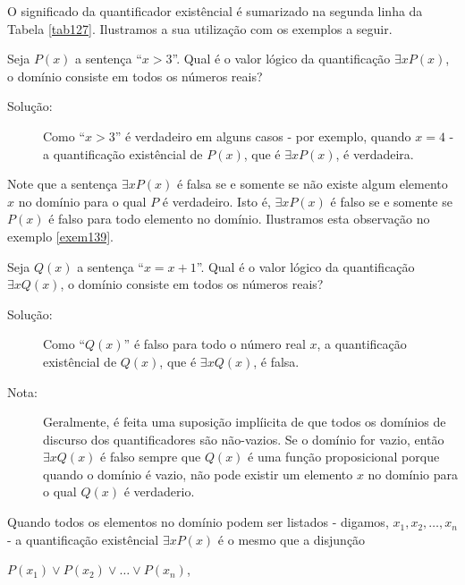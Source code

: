 O significado da quantificador existêncial é sumarizado na segunda linha da
Tabela \ref{tab127}. Ilustramos a sua utilização com os exemplos a seguir.

\begin{exmp}
\label{exem138}
Seja $P(x)$ a sentença ``$x>3$''. Qual é o valor lógico da quantificação
$\exists xP(x)$, o domínio consiste em todos os números reais?
\begin{description}
\item[Solução:] Como ``$x>3$'' é verdadeiro em alguns casos - por exemplo,
quando $x=4$ - a quantificação existêncial de $P(x)$, que é $\exists xP(x)$, é
verdadeira.
\end{description}
\end{exmp}

Note que a sentença $\exists xP(x)$ é falsa se e somente se não existe algum
elemento $x$ no domínio para o qual $P$ é verdadeiro. Isto é, $\exists xP(x)$ é
falso se e somente se $P(x)$ é falso para todo elemento no domínio. Ilustramos
esta observação no exemplo \ref{exem139}.

\begin{exmp}
\label{exem139}
Seja $Q(x)$ a sentença ``$x=x+1$''. Qual é o valor lógico da quantificação
$\exists xQ(x)$, o domínio consiste em todos os números reais?
\begin{description}
\item[Solução:] Como ``$Q(x)$'' é falso para todo o número real $x$, a
quantificação existêncial de $Q(x)$, que é $\exists xQ(x)$, é falsa.
\end{description}
\end{exmp}

\begin{description}
\item[Nota:] Geralmente, é feita uma suposição implíicita de que todos os
domínios de discurso dos quantificadores são não-vazios. Se o domínio for vazio,
então $\exists xQ(x)$ é falso sempre que $Q(x)$ é uma função proposicional
porque quando o domínio é vazio, não pode existir um elemento $x$ no domínio
para o qual $Q(x)$ é verdaderio.
\end{description}

Quando todos os elementos no domínio podem ser listados - digamos, $x_1, x_2,
\ldots, x_n$ - a quantificação existêncial $\exists xP(x)$ é o mesmo que a
disjunção

\begin{center}
$P(x_1) \lor P(x_2) \lor \ldots \lor P(x_n)$,
\end{center}

